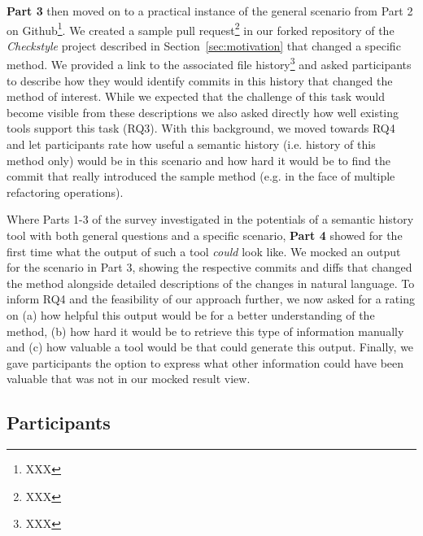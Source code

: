 \textbf{Part 3} then moved on to a practical instance of the general scenario from Part 2 on Github\footnote{XXX}. We created a sample pull request\footnote{XXX} in our forked repository of the \textit{Checkstyle} project described in Section~\ref{sec:motivation} that changed a specific method. We provided a link to the associated file history\footnote{XXX} and asked participants to describe how they would identify commits in this history that changed the method of interest. While we expected that the challenge of this task would become visible from these descriptions we also asked directly how well existing tools support this task (RQ3). With this background, we moved towards RQ4 and let participants rate how useful a semantic history (i.e. history of this method only) would be in this scenario and how hard it would be to find the commit that really introduced the sample method (e.g. in the face of multiple refactoring operations).

Where Parts 1-3 of the survey investigated in the potentials of a semantic history tool with both general questions and a specific scenario, \textbf{Part 4} showed for the first time what the output of such a tool \textit{could} look like. We mocked an output for the scenario in Part 3, showing the respective commits and diffs that changed the method alongside detailed descriptions of the changes in natural language. To inform RQ4 and the feasibility of our approach further, we now asked for a rating on (a) how helpful this output would be for a better understanding of the method, (b) how hard it would be to retrieve this type of information manually and (c) how valuable a tool would be that could generate this output. Finally, we gave participants the option to express what other information could have been valuable that was not in our mocked result view.


\subsection{Participants}
\label{sec:survey-participants}


